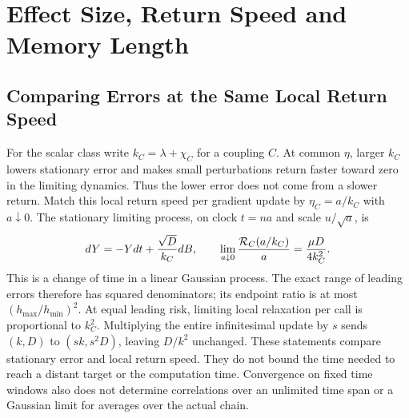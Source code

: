 \section{Effect Size, Return Speed and Memory Length}\label{sec:supplementary-extensions}
\subsection{Comparing Errors at the Same Local Return Speed}
For the scalar class write $k_C=\lambda+\chi_C$ for a coupling $C$.
At common $\eta$, larger $k_C$ lowers stationary error and makes small
perturbations return faster toward zero in the limiting dynamics. Thus the
lower error does not come from a slower return. Match this local return
speed per gradient update by $\eta_C=a/k_C$ with $a\downarrow0$.
The stationary limiting process, on clock $t=na$ and scale
$u/\sqrt a$, is
\[
 dY=-Ydt+\frac{\sqrt D}{k_C}dB,
 \qquad \lim_{a\downarrow0}\frac{\mathcal R_C(a/k_C)}a
        =\frac{\mu D}{4k_C^2}.
\]
This is a change of time in a linear Gaussian process. The exact range of
leading errors therefore has squared denominators; its endpoint ratio is at most
$(h_{\max}/h_{\min})^2$. At equal leading risk, limiting local relaxation
per call is proportional to $k_C^2$. Multiplying the entire infinitesimal
update by $s$ sends $(k,D)$ to $(sk,s^2D)$, leaving $D/k^2$ unchanged.
These statements compare stationary error and local return speed. They do
not bound the time needed to reach a distant target or the computation time.
Convergence on fixed time windows also does not determine correlations over
an unlimited time span or a Gaussian limit for averages over the actual chain.

